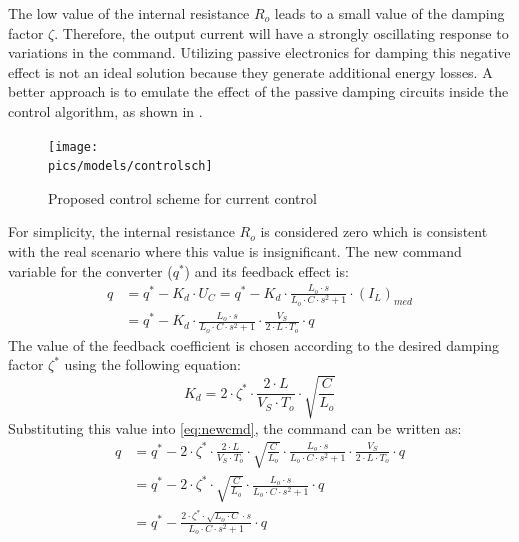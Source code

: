 The low value of the internal resistance $R_o$ leads to a small value of the damping factor $\zeta$.
Therefore, the output current will have a strongly oscillating response to variations in the command.
Utilizing passive electronics for damping this negative effect is not an ideal solution because they generate additional energy losses.
A better approach is to emulate the effect of the passive damping circuits inside the control algorithm, as shown in .
\begin{figure}[!ht]
    \begin{center}\texttt{[image: \\pics/models/controlsch]}\end{center}
    \caption{Proposed control scheme for current control}
    \label{fig:outfiltr}
\end{figure}
For simplicity, the internal resistance $R_o$ is considered zero which is consistent with the real scenario where this value is insignificant.
The new command variable for the converter ($q^*$) and its feedback effect is:
\begin{equation}
    \begin{split}
        \label{eq:newcmd}
        q &= q^* - K_d \cdot U_C = q^* - K_d \cdot \frac{L_o \cdot s}{L_o \cdot C \cdot s^2 + 1} \cdot (I_L)_{med} \\
        &= q^* - K_d \cdot \frac{L_o \cdot s}{L_o \cdot C \cdot s^2 + 1} \cdot \frac{V_S}{2 \cdot L \cdot T_o} \cdot q
    \end{split}
\end{equation}
The value of the feedback coefficient is chosen according to the desired damping factor $\zeta^*$ using the following equation:
\begin{equation}
    K_d = 2 \cdot \zeta^* \cdot \frac{2 \cdot L}{V_S \cdot T_o} \cdot \sqrt{\frac{C}{L_o}}
\end{equation}
Substituting this value into \eqref{eq:newcmd}, the command can be written as:
\begin{equation}
    \begin{split}
        q &= q^* - 2 \cdot \zeta^* \cdot \frac{2 \cdot L}{V_S \cdot T_o} \cdot \sqrt{\frac{C}{L_o}} \cdot \frac{L_o \cdot s}{L_o \cdot C \cdot s^2 + 1} \cdot \frac{V_S}{2 \cdot L \cdot T_o} \cdot q \\
        &= q^* - 2 \cdot \zeta^* \cdot \sqrt{\frac{C}{L_o}} \cdot \frac{L_o \cdot s}{L_o \cdot C \cdot s^2 + 1} \cdot q \\
        &= q^* - \frac{2 \cdot \zeta^* \cdot \sqrt{L_o \cdot C} \cdot s}{L_o \cdot C \cdot s^2 + 1} \cdot q
    \end{split}
\end{equation}
